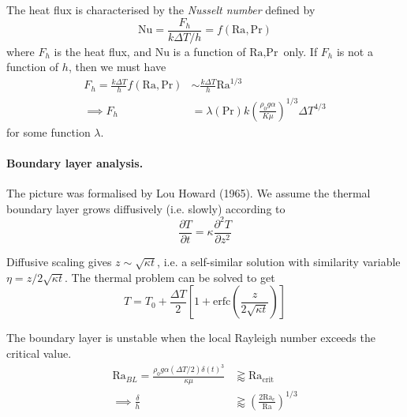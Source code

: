 \documentclass{jknotes}
\newcommand{\Ra}{\text{Ra}}
\begin{document}
The heat flux is characterised by the \emph{Nusselt number} defined by
\begin{equation}
	\text{Nu} = \frac{F_h}{k \Delta T/h} = f(\text{Ra},\text{Pr})
\end{equation}
where $F_h$ is the heat flux, and $\text{Nu}$ is a function of $\text{Ra},
\text{Pr}$ only. If $F_h$ is not a function of $h$, then we must
have
\begin{align}
	F_h = \frac{k \Delta T}{h} f(\text{Ra},\text{Pr}) &\sim \frac{k \Delta
	T}{h} \text{Ra}^{1/3} \\
	\implies F_h &= \lambda(\text{Pr})k \left( \frac{\rho_0 g
	\alpha}{K\mu}\right)^{1/3} \Delta T^{4/3}
\end{align}
for some function $\lambda$.

\paragraph{Boundary layer analysis.}
The picture was formalised by Lou Howard (1965). We assume the thermal
boundary layer grows diffusively (i.e. slowly) according to
\begin{equation}
	\frac{\partial T}{\partial t} = \kappa \frac{\partial^2 T}{\partial z^2} 
\end{equation}
\begin{center}
\end{center}

Diffusive scaling gives $z \sim \sqrt{\kappa t}$, i.e. a self-similar solution
with similarity variable $\eta = z/2\sqrt{\kappa t}$. The thermal problem can
be solved to get
\begin{equation}
	T = T_0 + \frac{\Delta T}{2}\left[ 1 + \text{erfc}(\frac{z}{2\sqrt{\kappa
	t}})\right]
\end{equation}

The boundary layer is unstable when the local Rayleigh number exceeds the
critical value.
\begin{align}
	\Ra_{BL} = \frac{\rho_0 g \alpha (\Delta T/2) \delta(t)^3}{\kappa \mu}
	&\gtrapprox \Ra_{\text{crit}} \\
	\implies \frac{\delta}{h} &\gtrapprox \left( \frac{2
	\Ra_c}{\Ra}\right)^{1/3}
\end{align}
\end{document}
